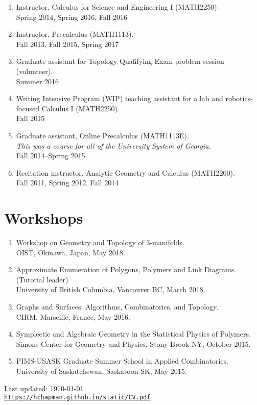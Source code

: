 \documentclass[letterpaper]{article}
\def\footerlink{https://hchapman.github.io/static/CV.pdf}
\renewenvironment{itemize}{
  \begin{list}{}{
    \setlength{\leftmargin}{1.5em}
  }
}{
  \end{list}
}
\begin{document}
\begin{enumerate}
\item Instructor, Calculus for Science and Engineering I (MATH2250). \\
  Spring 2014, Spring 2016, Fall 2016
\item Instructor, Precalculus (MATH1113). \\
  Fall 2013, Fall 2015, Spring 2017
\item Graduate assistant for Topology Qualifying Exam problem session
  (volunteer). \\
  Summer 2016
\item Writing Intensive Program (WIP) teaching assistant for a lab and
  robotics-focused Calculus I (MATH2250). \\
  Fall 2015
\item Graduate assistant, Online Precalculus (MATH1113E). \\
  \emph{This was a course for all of the University System of Georgia}.\\
  Fall 2014--Spring 2015
\item Recitation instructor, Analytic Geometry and Calculus
  (MATH2200).\\
  Fall 2011, Spring 2012, Fall 2014

\end{enumerate}

\section*{Workshops}
\begin{enumerate}
\item Workshop on Geometry and Topology of 3-manifolds. \\
  OIST, Okinawa, Japan, May 2018.
\item Approximate Enumeration of Polygons, Polymers and Link Diagrams. (Tutorial leader) \\
  University of British Columbia, Vancouver BC, March 2018.
\item Graphs and Surfaces: Algorithms, Combinatorics, and Topology. \\
  CIRM, Marseille, France, May 2016.
\item Symplectic and Algebraic Geometry in the Statistical Physics of Polymers. \\
  Simons Center for Geometry and Physics, Stony Brook NY, October 2015. 
\item PIMS-USASK Graduate Summer School in Applied Combinatorics. \\
  University of Saskatchewan, Saskatoon SK, May 2015.
\end{enumerate}

\bigskip

\begin{center}
  \begin{footnotesize}
    Last updated: \today \\
    \href{\footerlink}{\texttt{\footerlink}}
  \end{footnotesize}
\end{center}
\end{document}
